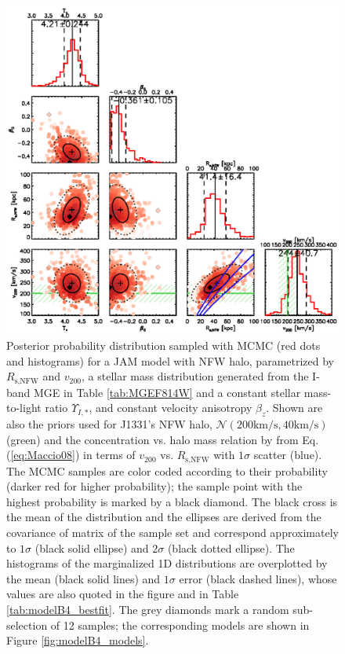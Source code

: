 \begin{figure}
\centering
\includegraphics[width=0.9\linewidth]{fig/B4_contour_plot_short.ps}
\caption{Posterior probability distribution sampled with MCMC (red dots and histograms) for a JAM model with NFW halo, parametrized by $R_\text{s,NFW}$ and $v_\text{200}$, a stellar mass distribution generated from the I-band MGE in Table \ref{tab:MGEF814W} and a constant stellar mass-to-light ratio $\Upsilon_{I,*}$, and constant velocity anisotropy $\beta_z$. Shown are also the priors used for J1331's NFW halo, $\mathscr{N}(200 \text{km/s},40 \text{km/s})$ (green) and the concentration vs. halo mass relation by \citet{Maccio08} from Eq. (\ref{eq:Maccio08}) in terms of $v_{200}$ vs. $R_\text{s,NFW}$ with $1\sigma$ scatter (blue). The MCMC samples are color coded according to their probability (darker red for higher probability); the sample point with the highest probability is marked by a black diamond. The black cross is the mean of the distribution and the ellipses are derived from the covariance of matrix of the sample set and correspond approximately to $1\sigma$ (black solid ellipse) and $2\sigma$ (black dotted ellipse). The histograms of the marginalized 1D distributions are overplotted by the mean (black solid lines) and $1\sigma$ error (black dashed lines), whose values are also quoted in the figure and in Table \ref{tab:modelB4_bestfit}. The grey diamonds mark a random sub-selection of 12 samples; the corresponding models are shown in Figure \ref{fig:modelB4_models}.}
\label{fig:modelB4_triangle}
\end{figure}

